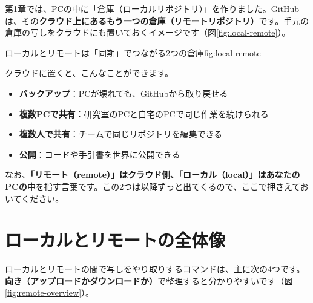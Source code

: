 第1章では、PCの中に「倉庫（ローカルリポジトリ）」を作りました。GitHubは、その\textbf{クラウド上にあるもう一つの倉庫（リモートリポジトリ）}です。手元の倉庫の写しをクラウドにも置いておくイメージです（図\ref{fig:local-remote}）。

\begin{numfig}{ローカルとリモートは「同期」でつながる2つの倉庫}{fig:local-remote}
\end{numfig}

クラウドに置くと、こんなことができます。

\begin{itemize}[leftmargin=1.4em]
  \item \textbf{バックアップ}：PCが壊れても、GitHubから取り戻せる
  \item \textbf{複数PCで共有}：研究室のPCと自宅のPCで同じ作業を続けられる
  \item \textbf{複数人で共有}：チームで同じリポジトリを編集できる
  \item \textbf{公開}：コードや手引書を世界に公開できる
\end{itemize}

なお、\textbf{「リモート（remote）」はクラウド側、「ローカル（local）」はあなたのPCの中}を指す言葉です。この2つは以降ずっと出てくるので、ここで押さえておいてください。

\section{ローカルとリモートの全体像}

ローカルとリモートの間で写しをやり取りするコマンドは、主に次の4つです。\textbf{向き（アップロードかダウンロードか）}で整理すると分かりやすいです（図\ref{fig:remote-overview}）。

